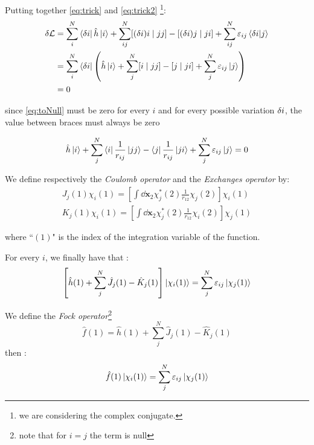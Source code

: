 \documentclass[a4paper,12pt]{article}
\begin{document}
Putting together \eqref{eq:trick} and \eqref{eq:trick2} \footnote{ we are considering the complex conjugate.}:
\begin{align}
	\var{\mathcal{L}} & = \sum_{i}^{N} \bra{\var{i}} \hat{h}  \ket{i} + \sum_{ij}^{N}  [ (\var{i})i \mid j j ] - [ (\var{i}) j \mid j i ] + \sum_{ij}^{N} \varepsilon_{ij} \bra{\var{i}}\ket{j}\\
	& = \sum_{i}^{N} \bra{\var{i}} \left( 
		 \hat{h}  \ket{i} + \sum_{j}^{N}  [ i \mid j j ] - [  j \mid j i ] + \sum_{j}^{N} \varepsilon_{ij} \ket{j}
	\right) \label{eq:toNull}
	\\
	& = 0
\end{align}

since \eqref{eq:toNull} must be zero for every $i$ and for every possible variation $\var{i}$, the value between braces must  always be zero

\begin{equation}
	\hat{h}  \ket{i} + \sum_{j}^{N}  \bra{i} \frac{1}{r_{ij}} \ket{j j } - \bra{ j } \frac{1}{r_{ij}} \ket{j i} + \sum_{j}^{N} \varepsilon_{ij} \ket{j} = 0
\end{equation}

We define respectively the \textit{Coulomb operator} and the \textit{Exchanges operator} by:
\begin{align}
	J_{j}(1) \chi_{i}(1) = \left[  \int \dd \mathbf{x}_{2} \chi_{j}^{*}(2) \frac{1}{r_{12}} \chi_{j}(2) \right] \chi_i(1) \label{eq:coulombOperator} \\
	K_{j}(1) \chi_{i}(1) = \left[  \int \dd \mathbf{x}_{2} \chi_{j}^{*}(2) \frac{1}{r_{12}} \chi_{i}(2) \right] \chi_j(1)	
\label{eq:exchangeOperator}
\end{align}

where ``$(1)$" is the index of the integration variable of the function.

For every $i$, we finally have that :
\begin{align}
	\left[ \hat{h}(1) + \sum_{j}^{N} \hat{J}_{j}(1) - \hat{K}_{j}(1) \right] \ket{\chi_i(1)} = \sum_{j}^{N} \varepsilon_{ij} \ket{\chi_{j}(1)} \label{eq:HartreeNonCan}
\end{align}

We define the \textit{Fock operator}\footnote{note that for $i=j$ the term is null}
\begin{equation}\label{eq:FockOperator}
	\hat{f}(1) = \hat{h}(1) + \sum_{j}^{N} \hat{J}_{j}(1) - \hat{K}_{j}(1)
\end{equation}
then :
\begin{align}
	\hat{f}(1)\ket{\chi_i(1)} = \sum_{j}^{N} \varepsilon_{ij} \ket{\chi_{j}(1)} 
\end{align}
\end{document}

